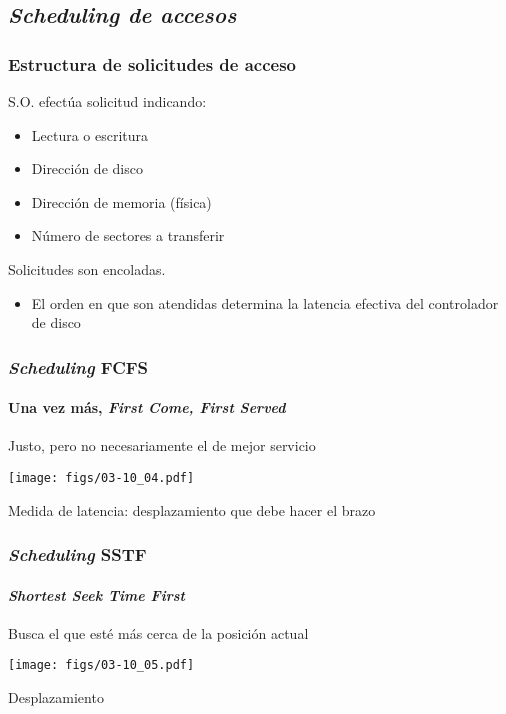 \documentclass[letter]{beamer}
\begin{document}
\subsection{{\em Scheduling de accesos}}

\begin{frame}
  \frametitle{Estructura de solicitudes de acceso}

  S.O. efectúa solicitud indicando:
  \begin{itemize}
    \item Lectura o escritura
    \item Dirección de disco
    \item Dirección de memoria (física)
    \item Número de sectores a transferir
  \end{itemize}
  
  Solicitudes son encoladas. 
  \begin{itemize}
    \item El orden en que son atendidas determina la latencia efectiva del controlador de disco
  \end{itemize}
\end{frame}
\begin{frame}
  \frametitle{{\em Scheduling} FCFS}
  \framesubtitle{Una vez más, {\em First Come, First Served}}
  
  Justo, pero no necesariamente el de mejor servicio
  
  \begin{center}
    \texttt{[image: figs/03-10\_04.pdf]}
  \end{center}

  Medida de latencia: desplazamiento que debe hacer el brazo 
  
\end{frame}
\begin{frame}
  \frametitle{{\em Scheduling} SSTF}
  \framesubtitle{{\em Shortest Seek Time First}}

  Busca el que esté más cerca de la posición actual

  \begin{center}
    \texttt{[image: figs/03-10\_05.pdf]}
  \end{center}

  Desplazamiento 
  
\end{frame}
\end{document}
